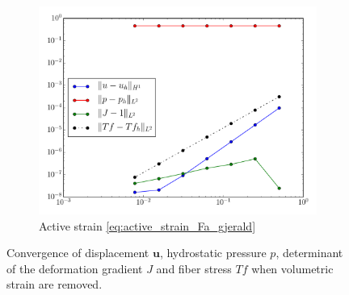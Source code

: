 \documentclass[a4paper,10pt]{article}
\newcommand{\uvec}{\mathbf{u}}
\begin{document}
\begin{figure}[htbp]
\begin{subfigure}[t]{0.3\textwidth}
    \includegraphics[width=\textwidth]{figures/mms2d_active_strain_qinc}
    \caption{\label{fig:mms2d_active_stain_gjerald_qinc}Active strain \eqref{eq:active_strain_Fa_gjerald} }    
\end{subfigure}
\caption{\label{fig:mms2d_convergence_qinc}Convergence of displacement $\uvec$, hydrostatic pressure $p$, determinant of the deformation gradient $J$ and fiber stress $Tf$ when volumetric strain are removed.}  
\end{figure}






\end{document}
